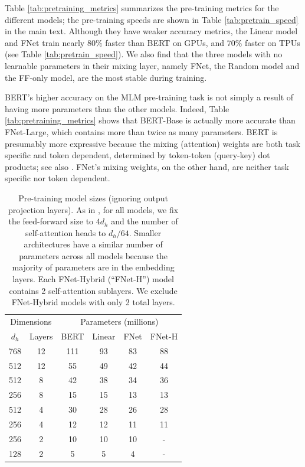 Table \ref{tab:pretraining_metrics} summarizes the pre-training metrics for the different models; the pre-training speeds are shown in Table \ref{tab:pretrain_speed} in the main text. Although they have weaker accuracy metrics, the Linear model and FNet train nearly $80\%$ faster than BERT on GPUs, and $70\%$ faster on TPUs (see Table \ref{tab:pretrain_speed}).  We also find that the three models with no learnable parameters in their mixing layer, namely FNet, the  Random model and the FF-only model, are the most stable during training.

BERT's higher accuracy on the MLM pre-training task is not simply a result of having more parameters than the other models. Indeed, Table \ref{tab:pretraining_metrics} shows that BERT-Base is actually more accurate than FNet-Large, which contains more than twice as many parameters. BERT is presumably more expressive because the mixing (attention) weights are both task specific and token dependent, determined by token-token (query-key) dot products; see also \citet{tay2020synthesizer}. FNet's mixing weights, on the other hand, are neither task specific nor token dependent.

\begin{table}
    \caption{Pre-training model sizes (ignoring output projection layers). As in \citet{turc2019well}, for all models, we fix the feed-forward size to $4d_{h}$ and the number of self-attention heads to $d_{h}/64$. Smaller architectures have a similar number of parameters across all models because the majority of parameters are in the embedding layers. Each FNet-Hybrid (``FNet-H'') model contains 2 self-attention sublayers. We exclude FNet-Hybrid models with only 2 total layers.}
    \label{tab:model_sizes}
    \centering
    \setlength{\tabcolsep}{4pt}
    \begin{tabular}{c c | c c c c}
        \hline
        \multicolumn{2}{c|}{Dimensions} & \multicolumn{4}{c}{Parameters (millions)}  \\ 
        $d_{h}$ & Layers & BERT & Linear & FNet & FNet-H  \\
          \hline \hline
        768  & 12 & 111 & 93 & 83 & 88 \\
        512  & 12 & 55 & 49 & 42 & 44 \\
        512  & 8 & 42 & 38 & 34 & 36 \\
        256 & 8 & 15 & 15 & 13 & 13 \\
        512 & 4 & 30 & 28 & 26 & 28 \\
        256  & 4 & 12 & 12 & 11 & 11\\
        256 & 2 & 10 & 10 & 10 & - \\
        128 & 2 & 5 & 5 & 4 & - \\ \hline
    \end{tabular}
\end{table}

